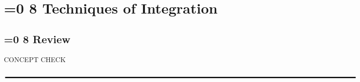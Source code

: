 \documentclass{sebase}
\begin{document}
\def\dint{\displaystyle \int}\def\diint{\displaystyle \iint}\def\diiint{\displaystyle \iiint}
\def\tint{\textstyle \int}\def\tiint{\textstyle \iint }\def\tiiint{{\textstyle \iiint }\def\tiiiint{\textstyle \iiiint }}%
\noCCC%
\renewcommand{\ET}{1}%
\renewcommand{\RM}{1}%
\renewcommand{\RM}{0}%
\setcounter{page}{73}%

\chapter{%
\ifnum\ET=0 8\fi%
\quad Techniques of Integration}

\section{%
\ifnum\ET=0 8\fi%
\quad Review\protect\vspace*{-21pt}}

CONCEPT CHECK\vspace{-18pt}

\vspace{12pt}\hskip-170pt\hfil%
\vspace{-6pt}$\rule{7.15in}{0.02in}$%
\vspace{12pt}\hfil%
\end{document}
